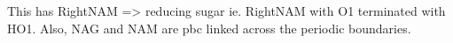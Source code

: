 This has RightNAM => reducing sugar ie. RightNAM with O1 terminated with HO1.
Also, NAG and NAM are pbc linked across the periodic boundaries.
